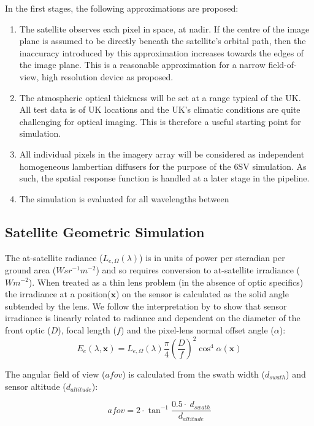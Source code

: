 \documentclass[10pt,a4paper,final,twocolumn]{article}
\begin{document}
In the first stages, the following approximations are proposed:
\begin{enumerate}
\item The satellite observes each pixel in space, at nadir. If the centre of the image plane is assumed to be directly beneath the satellite's orbital path, then the inaccuracy introduced by this approximation increases towards the edges of the image plane. This is a reasonable approximation for a narrow field-of-view, high resolution device as proposed. 
\item The atmospheric optical thickness will be set at a range typical of the UK. All test data is of UK locations and the UK's climatic conditions are quite challenging for optical imaging. This is therefore a useful starting point for simulation.
\item All individual pixels in the imagery array will be considered as independent homogeneous lambertian diffusers for the purpose of the 6SV simulation. As such, the spatial response function is handled at a later stage in the pipeline.
\item The simulation is evaluated for all wavelengths between 
\end{enumerate}

\subsection{Satellite Geometric Simulation}
The at-satellite radiance ($L_{e,\Omega}(\lambda)$) is in units of power per steradian per ground area ($W sr^{-1} m^{-2}$) and so requires conversion to at-satellite irradiance ($W m^{-2}$). When treated as a thin lens problem (in the absence of optic specifics) the irradiance at a position($\textbf{x}$) on the sensor is calculated as the solid angle subtended by the lens. We follow the interpretation by \cite{Sato1999} to show that sensor irradiance is linearly related to radiance and dependent on the diameter of the front optic ($D$), focal length ($f$) and the pixel-lens normal offset angle ($\alpha$):
\begin{equation}
E_e(\lambda, \textbf{x}) = L_{e,\Omega}(\lambda) \frac{\pi}{4} \left(\frac{D}{f}\right)^{2} \cos^4 \alpha(\textbf{x})
\label{eqn1}
\end{equation}

The angular field of view ($afov$) is calculated from the swath width ($d_{swath}$) and sensor altitude ($d_{altitude}$):

\begin{equation}
afov = 2\cdot \tan^{-1}\frac{0.5\cdot~d_{swath}}{d_{altitude}}
\end{equation}
\end{document}
